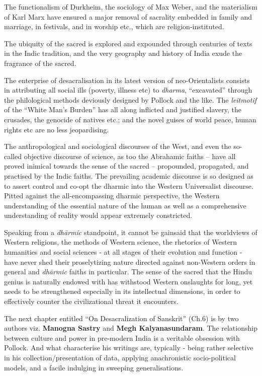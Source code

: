 The functionalism of Durkheim, the sociology of Max Weber, and the materialism of Karl Marx have ensured a major removal of sacrality embedded in family and marriage, in festivals, and in worship etc., which are religion-instituted.

The ubiquity of the sacred is explored and expounded through centuries of texts in the Indic tradition, and the very geography and history of India exude the fragrance of the sacred.

The enterprise of desacralisation in its latest version of neo-Orientalists consists in attributing all social ills (poverty, illness etc) to \textit{dharma}, “excavated” through the philological methods deviously designed by Pollock and the like. The \textit{leitmotif} of the “White Man’s Burden” has all along inflicted and justified slavery, the crusades, the genocide of natives etc.; and the novel guises of world peace, human rights etc are no less jeopardising.

The anthropological and sociological discourses of the West, and even the so-called objective discourse of science, as too the Abrahamic faiths – have all proved inimical towards the sense of the sacred – propounded, propagated, and practised by the Indic faiths. The prevailing academic discourse is so designed as to assert control and co-opt the dharmic into the Western Universalist discourse. Pitted against the all-encompassing dharmic perspective, the Western understanding of the essential nature of the human as well as a comprehensive understanding of reality would appear extremely constricted.

Speaking from a \textit{dhārmic} standpoint, it cannot be gainsaid that the worldviews of Western religions, the methods of Western science, the rhetorics of Western humanities and social sciences - at all stages of their evolution and function - have never shed their proselytizing nature directed against non-Western orders in general and \textit{dhārmic} faiths in particular. The sense of the sacred that the Hindu genius is naturally endowed with has withstood Western onslaughts for long, yet needs to be strengthened especially in its intellectual dimensions, in order to effectively counter the civilizational threat it encounters.

\vskip 2pt

The next chapter entitled “On Desacralization of Sanskrit” (Ch.6) is by two authors viz. \textbf{Manogna Sastry} and \textbf{Megh Kalyanasundaram}. The relationship between culture and power in pre-modern India is a veritable obsession with Pollock. And what characterise his writings are, typically - being rather selective in his collection/presentation of data, applying anachronistic socio-political models, and a facile indulging in sweeping generalisations.


